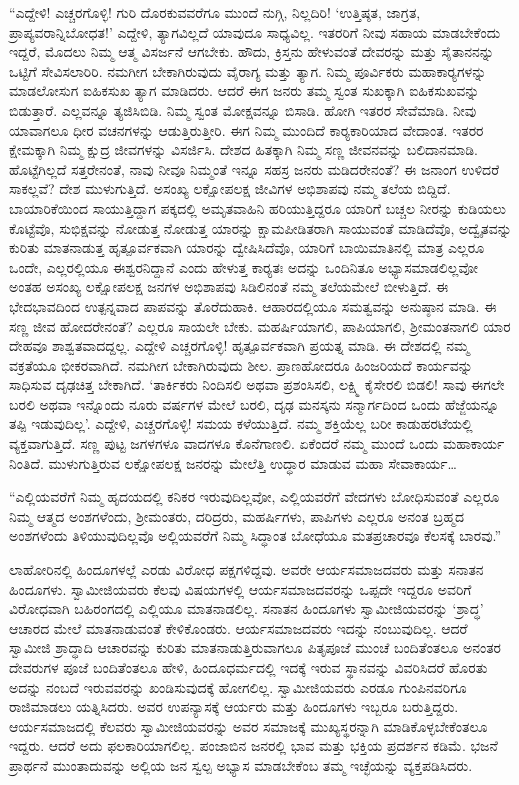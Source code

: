  “ಎದ್ದೇಳಿ! ಎಚ್ಚರಗೊಳ್ಳಿ! ಗುರಿ ದೊರಕುವವರೆಗೂ ಮುಂದೆ ನುಗ್ಗಿ, ನಿಲ್ಲದಿರಿ! ‘ಉತ್ತಿಷ್ಠತ, ಜಾಗ್ರತ, ಪ್ರಾಪ್ಯವರಾನ್ನಿಬೋಧತ!’ ಎದ್ದೇಳಿ, ತ್ಯಾಗವಿಲ್ಲದೆ ಯಾವುದೂ ಸಾಧ್ಯವಿಲ್ಲ. ಇತರರಿಗೆ ನೀವು ಸಹಾಯ ಮಾಡಬೇಕೆಂದು ಇದ್ದರೆ, ಮೊದಲು ನಿಮ್ಮ ಆತ್ಮ ವಿಸರ್ಜನೆ ಆಗಬೇಕು. ಹೌದು, ಕ್ರಿಸ್ತನು ಹೇಳುವಂತೆ ದೇವರನ್ನು ಮತ್ತು ಸೈತಾನನನ್ನು ಒಟ್ಟಿಗೆ ಸೇವಿಸಲಾರಿರಿ. ನಮಗೀಗ ಬೇಕಾಗಿರುವುದು ವೈರಾಗ್ಯ ಮತ್ತು ತ್ಯಾಗ. ನಿಮ್ಮ ಪೂರ್ವಿಕರು ಮಹಾಕಾರ‍್ಯಗಳನ್ನು ಮಾಡಲೋಸುಗ ಐಹಿಕಸುಖ ತ್ಯಾಗ ಮಾಡಿದರು. ಆದರೆ ಈಗ ಜನರು ತಮ್ಮ ಸ್ವಂತ ಸುಖಕ್ಕಾಗಿ ಐಹಿಕಸುಖವನ್ನು ಬಿಡುತ್ತಾರೆ. ಎಲ್ಲವನ್ನೂ ತ್ಯಜಿಸಿಬಿಡಿ. ನಿಮ್ಮ ಸ್ವಂತ ಮೋಕ್ಷವನ್ನೂ ಬಿಸಾಡಿ. ಹೋಗಿ ಇತರರ ಸೇವೆಮಾಡಿ. ನೀವು ಯಾವಾಗಲೂ ಧೀರ ವಚನಗಳನ್ನು ಆಡುತ್ತಿರುತ್ತೀರಿ. ಈಗ ನಿಮ್ಮ ಮುಂದಿದೆ ಕಾರ‍್ಯಕಾರಿಯಾದ ವೇದಾಂತ. ಇತರರ ಕ್ಷೇಮಕ್ಕಾಗಿ ನಿಮ್ಮ ಕ್ಷುದ್ರ ಜೀವಗಳನ್ನು ವಿಸರ್ಜಿಸಿ. ದೇಶದ ಹಿತಕ್ಕಾಗಿ ನಿಮ್ಮ ಸಣ್ಣ ಜೀವನವನ್ನು ಬಲಿದಾನಮಾಡಿ. ಹೊಟ್ಟೆಗಿಲ್ಲದೆ ಸತ್ತರೇನಂತೆ, ನಾವು ನೀವೂ ನಿಮ್ಮಂತೆ ಇನ್ನೂ ಸಹಸ್ರ ಜನರು ಮಡಿದರೇನಂತೆ? ಈ ಜನಾಂಗ ಉಳಿದರೆ ಸಾಕಲ್ಲವೆ? ದೇಶ ಮುಳುಗುತ್ತಿದೆ. ಅಸಂಖ್ಯ ಲಕ್ಷೋಪಲಕ್ಷ ಜೀವಿಗಳ ಅಭಿಶಾಪವು ನಮ್ಮ ತಲೆಯ ಬಿದ್ದಿದೆ. ಬಾಯಾರಿಕೆಯಿಂದ ಸಾಯುತ್ತಿದ್ದಾಗ ಪಕ್ಕದಲ್ಲಿ ಅಮೃತವಾಹಿನಿ ಹರಿಯುತ್ತಿದ್ದರೂ ಯಾರಿಗೆ ಬಚ್ಚಲ ನೀರನ್ನು ಕುಡಿಯಲು ಕೊಟ್ಟೆವೊ, ಸುಭಿಕ್ಷವನ್ನು ನೋಡುತ್ತ ನೋಡುತ್ತ ಯಾರನ್ನು ಕ್ಷಾಮಪೀಡಿತರಾಗಿ ಸಾಯುವಂತೆ ಮಾಡಿದೆವೊ, ಅದ್ವೈತವನ್ನು ಕುರಿತು ಮಾತನಾಡುತ್ತ ಹೃತ್ಪೂರ್ವಕವಾಗಿ ಯಾರನ್ನು ದ್ವೇಷಿಸಿದೆವೊ, ಯಾರಿಗೆ ಬಾಯಿಮಾತಿನಲ್ಲಿ ಮಾತ್ರ ಎಲ್ಲರೂ ಒಂದೇ, ಎಲ್ಲರಲ್ಲಿಯೂ ಈಶ್ವರನಿದ್ದಾನೆ ಎಂದು ಹೇಳುತ್ತ ಕಾರ‍್ಯತಃ ಅದನ್ನು ಒಂದಿನಿತೂ ಅಭ್ಯಾಸಮಾಡಲಿಲ್ಲವೋ ಅಂತಹ ಅಸಂಖ್ಯ ಲಕ್ಷೋಪಲಕ್ಷ ಜನಗಳ ಅಭಿಶಾಪವು ಸಿಡಿಲಿನಂತೆ ನಮ್ಮ ತಲೆಯಮೇಲೆ ಬೀಳುತ್ತಿದೆ. ಈ ಭೇದಭಾವದಿಂದ ಉತ್ಪನ್ನವಾದ ಪಾಪವನ್ನು ತೊರೆದುಹಾಕಿ. ಆಹಾರದಲ್ಲಿಯೂ ಸಮತ್ವವನ್ನು ಅನುಷ್ಠಾನ ಮಾಡಿ. ಈ ಸಣ್ಣ ಜೀವ ಹೋದರೇನಂತೆ? ಎಲ್ಲರೂ ಸಾಯಲೇ ಬೇಕು. ಮಹರ್ಷಿಯಾಗಲಿ, ಪಾಪಿಯಾಗಲಿ, ಶ‍್ರೀಮಂತನಾಗಲಿ ಯಾರ ದೇಹವೂ ಶಾಶ್ವತವಾದದ್ದಲ್ಲ. ಎದ್ದೇಳಿ ಎಚ್ಚರಗೊಳ್ಳಿ! ಹೃತ್ಪೂರ್ವಕವಾಗಿ ಪ್ರಯತ್ನ ಮಾಡಿ. ಈ ದೇಶದಲ್ಲಿ ನಮ್ಮ ವಕ್ರತೆಯೂ ಭೀಕರವಾಗಿದೆ. ನಮಗೀಗ ಬೇಕಾಗಿರುವುದು ಶೀಲ. ಪ್ರಾಣಹೋದರೂ ಹಿಂಜರಿಯದೆ ಕಾರ್ಯವನ್ನು ಸಾಧಿಸುವ ದೃಢಚಿತ್ತ ಬೇಕಾಗಿದೆ. ‘ತಾರ್ಕಿಕರು ನಿಂದಿಸಲಿ ಅಥವಾ ಪ್ರಶಂಸಿಸಲಿ, ಲಕ್ಷ್ಮಿ ಕೈಸೇರಲಿ ಬಿಡಲಿ! ಸಾವು ಈಗಲೇ ಬರಲಿ ಅಥವಾ ಇನ್ನೊಂದು ನೂರು ವರ್ಷಗಳ ಮೇಲೆ ಬರಲಿ, ದೃಢ ಮನಸ್ಕನು ಸನ್ಮಾರ್ಗದಿಂದ ಒಂದು ಹೆಜ್ಜೆಯನ್ನೂ ತಪ್ಪಿ ಇಡುವುದಿಲ್ಲ’. ಎದ್ದೇಳಿ, ಎಚ್ಚರಗೊಳ್ಳಿ! ಸಮಯ ಕಳೆಯುತ್ತಿದೆ. ನಮ್ಮ ಶಕ್ತಿಯೆಲ್ಲ ಬರೀ ಕಾಡುಹರಟೆಯಲ್ಲಿ ವ್ಯಕ್ತವಾಗುತ್ತಿದೆ. ಸಣ್ಣ ಪುಟ್ಟ ಜಗಳಗಳೂ ವಾದಗಳೂ ಕೊನೆಗಾಣಲಿ. ಏಕೆಂದರೆ ನಮ್ಮ ಮುಂದೆ ಒಂದು ಮಹಾಕಾರ್ಯ ನಿಂತಿದೆ. ಮುಳುಗುತ್ತಿರುವ ಲಕ್ಷೋಪಲಕ್ಷ ಜನರನ್ನು ಮೇಲೆತ್ತಿ ಉದ್ಧಾರ ಮಾಡುವ ಮಹಾ ಸೇವಾಕಾರ್ಯ… 

 “ಎಲ್ಲಿಯವರೆಗೆ ನಿಮ್ಮ ಹೃದಯದಲ್ಲಿ ಕನಿಕರ ಇರುವುದಿಲ್ಲವೋ, ಎಲ್ಲಿಯವರೆಗೆ ವೇದಗಳು ಬೋಧಿಸುವಂತೆ ಎಲ್ಲರೂ ನಿಮ್ಮ ಆತ್ಮದ ಅಂಶಗಳೆಂದು, ಶ‍್ರೀಮಂತರು, ದರಿದ್ರರು, ಮಹರ್ಷಿಗಳು, ಪಾಪಿಗಳು ಎಲ್ಲರೂ ಅನಂತ ಬ್ರಹ್ಮದ ಅಂಶಗಳೆಂದು ತಿಳಿಯುವುದಿಲ್ಲವೊ ಅಲ್ಲಿಯವರೆಗೆ ನಿಮ್ಮ ಸಿದ್ಧಾಂತ ಬೋಧೆಯೂ ಮತಪ್ರಚಾರವೂ ಕೆಲಸಕ್ಕೆ ಬಾರವು.” 

 ಲಾಹೋರಿನಲ್ಲಿ ಹಿಂದೂಗಳಲ್ಲೆ ಎರಡು ವಿರೋಧ ಪಕ್ಷಗಳಿದ್ದವು. ಅವರೇ ಆರ್ಯಸಮಾಜದವರು ಮತ್ತು ಸನಾತನ ಹಿಂದೂಗಳು. ಸ್ವಾಮೀಜಿಯವರು ಕೆಲವು ವಿಷಯಗಳಲ್ಲಿ ಆರ್ಯಸಮಾಜದವರನ್ನು ಒಪ್ಪದೇ ಇದ್ದರೂ ಅವರಿಗೆ ವಿರೋಧವಾಗಿ ಬಹಿರಂಗದಲ್ಲಿ ಎಲ್ಲಿಯೂ ಮಾತನಾಡಲಿಲ್ಲ. ಸನಾತನ ಹಿಂದೂಗಳು ಸ್ವಾಮೀಜಿಯವರನ್ನು ‘ಶ್ರಾದ್ಧ’ ಆಚಾರದ ಮೇಲೆ ಮಾತನಾಡುವಂತೆ ಕೇಳಿಕೊಂಡರು. ಆರ್ಯಸಮಾಜದವರು ಇದನ್ನು ನಂಬುವುದಿಲ್ಲ. ಆದರೆ ಸ್ವಾಮೀಜಿ ಶ್ರಾದ್ಧಾದಿ ಆಚಾರವನ್ನು ಕುರಿತು ಮಾತನಾಡುತ್ತಿರುವಾಗಲೂ ಪಿತೃಪೂಜೆ ಮುಂಚೆ ಬಂದಿತೆಂತಲೂ ಅನಂತರ ದೇವರುಗಳ ಪೂಜೆ ಬಂದಿತೆಂತಲೂ ಹೇಳಿ, ಹಿಂದೂಧರ್ಮದಲ್ಲಿ ಇದಕ್ಕೆ ಇರುವ ಸ್ಥಾನವನ್ನು ವಿವರಿಸಿದರೆ ಹೊರತು ಅದನ್ನು ನಂಬದೆ ಇರುವವರನ್ನು ಖಂಡಿಸುವುದಕ್ಕೆ ಹೋಗಲಿಲ್ಲ. ಸ್ವಾಮೀಜಿಯವರು ಎರಡೂ ಗುಂಪಿನವರಿಗೂ ರಾಜಿಮಾಡಲು ಯತ್ನಿಸಿದರು. ಅವರ ಉಪನ್ಯಾಸಕ್ಕೆ ಆರ್ಯರು ಮತ್ತು ಹಿಂದೂಗಳು ಇಬ್ಬರೂ ಬರುತ್ತಿದ್ದರು. ಆರ್ಯಸಮಾಜದಲ್ಲಿ ಕೆಲವರು ಸ್ವಾಮೀಜಿಯವರನ್ನು ಅವರ ಸಮಾಜಕ್ಕೆ ಮುಖ್ಯಸ್ಥರನ್ನಾಗಿ ಮಾಡಿಕೊಳ್ಳಬೇಕೆಂತಲೂ ಇದ್ದರು. ಆದರೆ ಅದು ಫಲಕಾರಿಯಾಗಲಿಲ್ಲ. ಪಂಜಾಬಿನ ಜನರಲ್ಲಿ ಭಾವ ಮತ್ತು ಭಕ್ತಿಯ ಪ್ರದರ್ಶನ ಕಡಿಮೆ. ಭಜನೆ ಪ್ರಾರ್ಥನೆ ಮುಂತಾದುವನ್ನು ಅಲ್ಲಿಯ ಜನ ಸ್ವಲ್ಪ ಅಭ್ಯಾಸ ಮಾಡಬೇಕೆಂಬ ತಮ್ಮ ಇಚ್ಛೆಯನ್ನು ವ್ಯಕ್ತಪಡಿಸಿದರು. 

